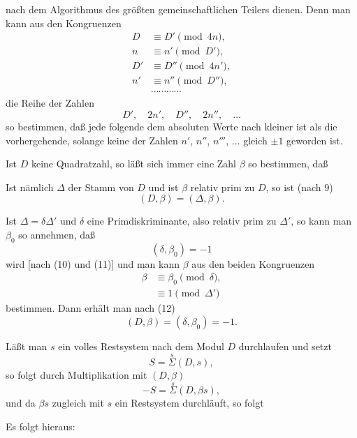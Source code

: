 nach dem Algorithmus des größten gemeinschaftlichen Teilers dienen. Denn man kann aus den Kongruenzen
\[
\begin{aligned}
D &\equiv D' \pmod{4n}, \\
n &\equiv n' \pmod{D'}, \\
D' &\equiv D'' \pmod{4n'}, \\
n' &\equiv n'' \pmod{D''}, \\
&\cdots\cdots\cdots\cdots
\end{aligned}
\]
die Reihe der Zahlen
\[
D', \quad 2n', \quad D'', \quad 2n'', \quad \dots
\]
so bestimmen, daß jede folgende dem absoluten Werte nach kleiner ist als die vorhergehende, solange keine der Zahlen $n'$, $n''$, $n'''$, $\dots$ gleich $\pm 1$ geworden ist.

Ist $D$ keine Quadratzahl, so läßt sich immer eine Zahl $\beta$ so bestimmen, daß

Ist nämlich $\varDelta$ der Stamm von $D$ und ist $\beta$ relativ prim zu $D$, so ist (nach 9)
\[
(D, \beta) = (\varDelta, \beta).
\]

Ist $\varDelta = \delta \varDelta'$ und $\delta$ eine Primdiskriminante, also relativ prim zu $\varDelta'$, so kann man $\beta_0$ so annehmen, daß
\[
(\delta, \beta_0) = -1
\]
wird [nach (10) und (11)] und man kann $\beta$ aus den beiden Kongruenzen
\[
\begin{aligned}
\beta &\equiv \beta_0 \pmod{\delta}, \\
&\equiv 1 \pmod{\varDelta'}
\end{aligned}
\]
bestimmen. Dann erhält man nach (12)
\[
(D, \beta) = (\delta, \beta_0) = -1.
\]

Läßt man $s$ ein volles Restsystem nach dem Modul $D$ durchlaufen und setzt
\[
S = \overset{s}{\Sigma}(D, s), %
\]
so folgt durch Multiplikation mit $(D, \beta)$
\[
-S = \overset{s}{\Sigma}(D, \beta s),
\]
und da $\beta s$ zugleich mit $s$ ein Restsystem durchläuft, so folgt

Es folgt hieraus:
